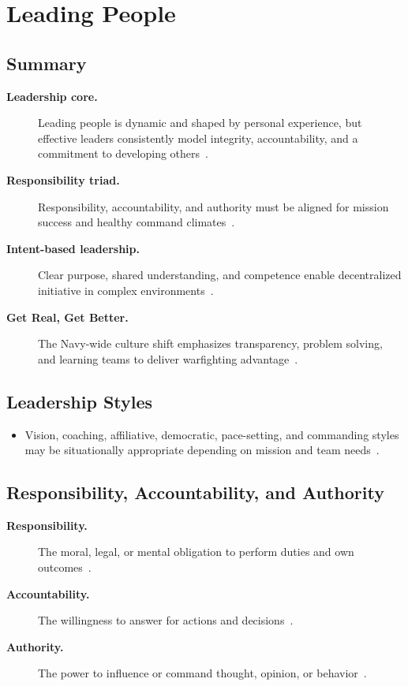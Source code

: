 \documentclass[../main.tex]{subfiles}
\begin{document}
\section{Leading People}

\subsection{Summary}
\begin{description}
  \item[\textbf{Leadership core.}] Leading people is dynamic and shaped by personal experience, but effective leaders consistently model integrity, accountability, and a commitment to developing others~\autocite{edo-5-1-6-leading-people-2025}.
  \item[\textbf{Responsibility triad.}] Responsibility, accountability, and authority must be aligned for mission success and healthy command climates~\autocite{edo-5-1-6-leading-people-2025}.
  \item[\textbf{Intent-based leadership.}] Clear purpose, shared understanding, and competence enable decentralized initiative in complex environments~\autocite{edo-5-1-6-leading-people-2025}.
  \item[\textbf{Get Real, Get Better.}] The Navy-wide culture shift emphasizes transparency, problem solving, and learning teams to deliver warfighting advantage~\autocite{edo-5-1-6-leading-people-2025,Navy-NLDF-GRGB-Leaders-Toolkit-2026}.
\end{description}

\subsection{Leadership Styles}
\begin{itemize}
  \item Vision, coaching, affiliative, democratic, pace-setting, and commanding styles may be situationally appropriate depending on mission and team needs~\autocite{edo-5-1-6-leading-people-2025}.
\end{itemize}

\subsection{Responsibility, Accountability, and Authority}
\begin{description}
  \item[\textbf{Responsibility.}] The moral, legal, or mental obligation to perform duties and own outcomes~\autocite{edo-5-1-6-leading-people-2025}.
  \item[\textbf{Accountability.}] The willingness to answer for actions and decisions~\autocite{edo-5-1-6-leading-people-2025}.
  \item[\textbf{Authority.}] The power to influence or command thought, opinion, or behavior~\autocite{edo-5-1-6-leading-people-2025}.
\end{description}
\end{document}
